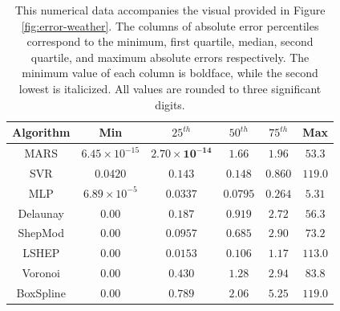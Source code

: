 \documentclass[smallextended,final]{svjour3}       %
\begin{document}
\begin{appendix}
\begin{table}
  \centering
  \begin{tabular}{c|c|c|c|c|c}
    \hline
    Algorithm & Min & $25^{th}$ & $50^{th}$ & $75^{th}$ & Max\\
    \hline
    MARS & $\mathit{6.45 \times 10^{-15}}$ & $\mathbf{2.70 \times 10^{-14}}$ & $1.66$ & $1.96$ & $\mathit{53.3}$\\
    SVR & $0.0420$ & $0.143$ & $0.148$ & $\mathit{0.860}$ & $119.0$\\
    MLP & $6.89 \times 10^{-5}$ & $0.0337$ & $\mathbf{0.0795}$ & $\mathbf{0.264}$ & $\mathbf{5.31}$\\
    Delaunay & $\mathbf{0.00}$ & $0.187$ & $0.919$ & $2.72$ & $56.3$\\
    ShepMod & $\mathbf{0.00}$ & $0.0957$ & $0.685$ & $2.90$ & $73.2$\\
    LSHEP & $\mathbf{0.00}$ & $\mathit{0.0153}$ & $\mathit{0.106}$ & $1.17$ & $113.0$\\
    Voronoi & $\mathbf{0.00}$ & $0.430$ & $1.28$ & $2.94$ & $83.8$\\
    BoxSpline & $\mathbf{0.00}$ & $0.789$ & $2.06$ & $5.25$ & $119.0$\\
    \hline
  \end{tabular}
  \caption{This numerical data accompanies the visual provided in
    Figure \ref{fig:error-weather}. The columns of absolute error
    percentiles correspond to the minimum, first quartile, median,
    second quartile, and maximum absolute errors respectively. The
    minimum value of each column is boldface, while the second lowest
    is italicized. All values are rounded to three significant
    digits.}
  \label{table:error-weather}
\end{table}


\end{appendix}
\end{document}
